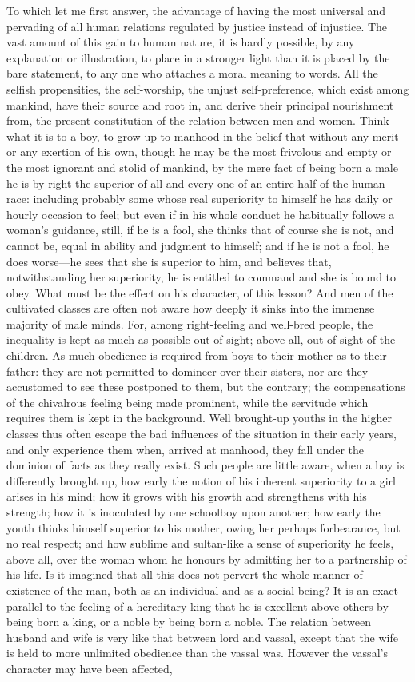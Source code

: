\documentclass[12pt]{report}
\begin{document}
To which let me first answer, the advantage of having the most universal and pervading of all human relations regulated by justice instead of injustice. The vast amount of this gain to human nature, it is hardly possible, by any explanation or illustration, to place in a stronger light than it is placed by the bare statement, to any one who attaches a moral meaning to words. All the selfish propensities, the self-worship, the unjust self-preference, which exist among mankind, have their source and root in, and derive their principal nourishment from, the present constitution of the relation between men and women. Think what it is to a boy, to grow up to manhood in the belief that without any merit or any exertion of his own, though he may be the most frivolous and empty or the most ignorant and stolid of mankind, by the mere fact of being born a male he is by right the superior of all and every one of an entire half of the human race: including probably some whose real superiority to himself he has daily or hourly occasion to feel; but even if in his whole conduct he habitually follows a woman's guidance, still, if he is a fool, she thinks that of course she is not, and cannot be, equal in ability and judgment to himself; and if he is not a fool, he does worse—he sees that she is superior to him, and believes that, notwithstanding her superiority, he is entitled to command and she is bound to obey. What must be the effect on his character, of this lesson? And men of the cultivated classes are often not aware how deeply it sinks into the immense majority of male minds. For, among right-feeling and well-bred people, the inequality is kept as much as possible out of sight; above all, out of sight of the children. As much obedience is required from boys to their mother as to their father: they are not permitted to domineer over their sisters, nor are they accustomed to see these postponed to them, but the contrary; the compensations of the chivalrous feeling being made prominent, while the servitude which requires them is kept in the background. Well brought-up youths in the higher classes thus often escape the bad influences of the situation in their early years, and only experience them when, arrived at manhood, they fall under the dominion of facts as they really exist. Such people are little aware, when a boy is differently brought up, how early the notion of his inherent superiority to a girl arises in his mind; how it grows with his growth and strengthens with his strength; how it is inoculated by one schoolboy upon another; how early the youth thinks himself superior to his mother, owing her perhaps forbearance, but no real respect; and how sublime and sultan-like a sense of superiority he feels, above all, over the woman whom he honours by admitting her to a partnership of his life. Is it imagined that all this does not pervert the whole manner of existence of the man, both as an individual and as a social being? It is an exact parallel to the feeling of a hereditary king that he is excellent above others by being born a king, or a noble by being born a noble. The relation between husband and wife is very like that between lord and vassal, except that the wife is held to more unlimited obedience than the vassal was. However the vassal's character may have been affected, 
\end{document}
